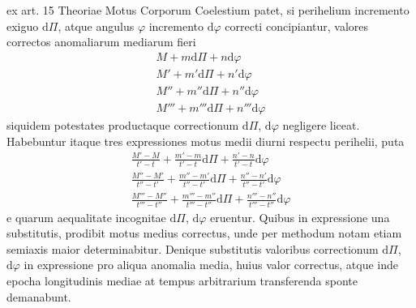 \noindent{}
ex art. 15 Theoriae Motus Corporum Coelestium patet, si perihelium incremento exiguo $\mathrm d\Pi$, atque angulus $\varphi$ incremento $\mathrm d\varphi$ correcti concipiantur, valores correctos anomaliarum mediarum fieri
\[
\begin{gathered}
M+m\mathrm d\Pi+n\mathrm d\varphi\\
M'+m'\mathrm d\Pi+n'\mathrm d\varphi\\
M''+m''\mathrm d\Pi+n''\mathrm d\varphi\\
M'''+m'''\mathrm d\Pi+n'''\mathrm d\varphi
\end{gathered}
\]
siquidem potestates productaque correctionum $\mathrm d\Pi$, $\mathrm d\varphi$ negligere liceat. Habebuntur itaque tres expressiones motus medii diurni respectu perihelii, puta
\[
\begin{gathered}
\frac{M'-M}{t'-t}+\frac{m'-m}{t'-t}\mathrm d\Pi+\frac{n'-n}{t'-t}\mathrm d\varphi\\[5pt]
\frac{M''-M'}{t''-t'}+\frac{m''-m'}{t''-t'}\mathrm d\Pi+\frac{n''-n'}{t''-t'}\mathrm d\varphi\\[5pt]
\frac{M'''-M''}{t'''-t''}+\frac{m'''-m''}{t'''-t''}\mathrm d\Pi+\frac{n'''-n''}{t'''-t''}\mathrm d\varphi
\end{gathered}
\]
e quarum aequalitate incognitae $\mathrm d\Pi$, $\mathrm d\varphi$ eruentur. Quibus in expressione una substitutis, prodibit motus medius correctus, unde per methodum notam etiam semiaxis maior determinabitur. Denique substitutis valoribus correctionum $\mathrm d\Pi$, $\mathrm d\varphi$ in expressione pro aliqua anomalia media, huius valor correctus, atque inde epocha longitudinis mediae at tempus arbitrarium transferenda sponte demanabunt.

